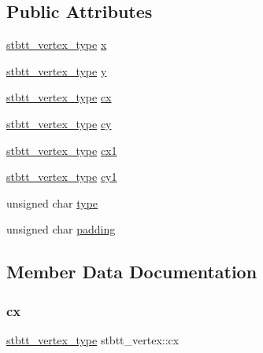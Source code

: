 \subsection*{Public Attributes}
\begin{DoxyCompactItemize}
\item 
\mbox{\hyperlink{imstb__truetype_8h_ab8fd8e5e0b82b0f7da54532035e47b22}{stbtt\+\_\+vertex\+\_\+type}} \mbox{\hyperlink{structstbtt__vertex_a81773edbe760d0e090561a3c1e86c919}{x}}
\item 
\mbox{\hyperlink{imstb__truetype_8h_ab8fd8e5e0b82b0f7da54532035e47b22}{stbtt\+\_\+vertex\+\_\+type}} \mbox{\hyperlink{structstbtt__vertex_a9052065ca544b63d537325b246928cfc}{y}}
\item 
\mbox{\hyperlink{imstb__truetype_8h_ab8fd8e5e0b82b0f7da54532035e47b22}{stbtt\+\_\+vertex\+\_\+type}} \mbox{\hyperlink{structstbtt__vertex_a43835489e2a151b31cb100d20f8adeae}{cx}}
\item 
\mbox{\hyperlink{imstb__truetype_8h_ab8fd8e5e0b82b0f7da54532035e47b22}{stbtt\+\_\+vertex\+\_\+type}} \mbox{\hyperlink{structstbtt__vertex_a5610d6335aa6962d970fc7fd2225545e}{cy}}
\item 
\mbox{\hyperlink{imstb__truetype_8h_ab8fd8e5e0b82b0f7da54532035e47b22}{stbtt\+\_\+vertex\+\_\+type}} \mbox{\hyperlink{structstbtt__vertex_a1c45a8d41727b24b84f97a944f2b800a}{cx1}}
\item 
\mbox{\hyperlink{imstb__truetype_8h_ab8fd8e5e0b82b0f7da54532035e47b22}{stbtt\+\_\+vertex\+\_\+type}} \mbox{\hyperlink{structstbtt__vertex_a68227d28643f5667064fa3c385f4ea7d}{cy1}}
\item 
unsigned char \mbox{\hyperlink{structstbtt__vertex_aa325b3707b88e7e104c0de46bb2bf395}{type}}
\item 
unsigned char \mbox{\hyperlink{structstbtt__vertex_a8bd328747e8ea018612960a52e3e3ede}{padding}}
\end{DoxyCompactItemize}


\subsection{Member Data Documentation}
\mbox{\label{structstbtt__vertex_a43835489e2a151b31cb100d20f8adeae}} 
\subsubsection{\texorpdfstring{cx}{cx}}
{\footnotesize\ttfamily \mbox{\hyperlink{imstb__truetype_8h_ab8fd8e5e0b82b0f7da54532035e47b22}{stbtt\+\_\+vertex\+\_\+type}} stbtt\+\_\+vertex\+::cx}

